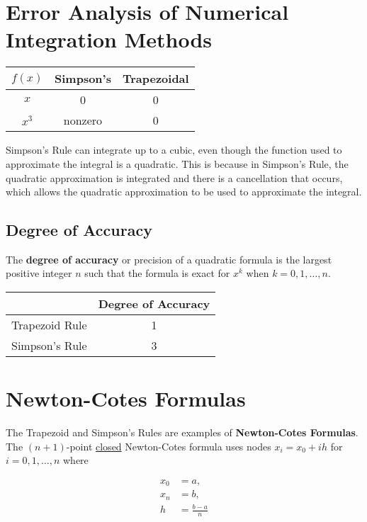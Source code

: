 \section{Error Analysis of Numerical Integration Methods}
\label{sec:error_analysis}

\begin{center}
  \begin{tabular}{c|c|c}
    $f(x)$ & Simpson's & Trapezoidal \\ 
    \hline
    $x$ & 0 & 0 \\
    $x^3$ & nonzero & 0
  \end{tabular}
\end{center}

Simpson's Rule can integrate up to a cubic, even though the function used to
approximate the integral is a quadratic.  This is because in Simpson's Rule,
the quadratic approximation is integrated and there is a cancellation that
occurs, which allows the quadratic approximation to be used to approximate
the integral.

\subsection{Degree of Accuracy}
\label{sec:degree_of_accuracy}

 The \textbf{degree of accuracy} or precision of a quadratic formula is the largest
positive integer $n$ such that the formula is exact for $x^k$ when $k=0,1,\dots,n$.

\begin{center}
  \begin{tabular}{c|c}
    & Degree of Accuracy \\ \hline
    Trapezoid Rule & 1 \\
    Simpson's Rule & 3 \\
  \end{tabular}
\end{center}

\section{Newton-Cotes Formulas}
\label{sec:newton_cotes_formulas}

The Trapezoid and Simpson's Rules are examples of \textbf{Newton-Cotes
Formulas}. The $(n+1)$-point \uline{closed} Newton-Cotes formula uses nodes $x_i
= x_0+ih$ for $i=0,1,\dots,n$ where 

\begin{align*}
  x_0 &= a, \\
  x_n &= b, \\
  h &= \frac{b-a}{n}
\end{align*}


